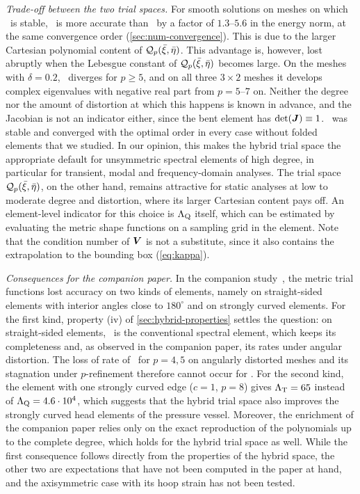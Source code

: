 \emph{Trade-off between the two trial spaces.} For smooth solutions on meshes on which \PM\ is stable, \PM\ is more accurate than \PH\ by a factor of $1.3$--$5.6$ in the energy norm, at the same convergence order (\cref{sec:num-convergence}). This is due to the larger Cartesian polynomial content of $\mathcal Q_p(\bar\xi,\bar\eta)$. This advantage is, however, lost abruptly when the Lebesgue constant of $\mathcal Q_p(\bar\xi,\bar\eta)$ becomes large. On the meshes with $\delta=0.2$, \PM\ diverges for $p\ge5$, and on all three $3\times2$ meshes it develops complex eigenvalues with negative real part from $p=5$--$7$ on. Neither the degree nor the amount of distortion at which this happens is known in advance, and the Jacobian is not an indicator either, since the bent element has $\det(\bm{J})\equiv1$. \PH\ was stable and converged with the optimal order in every case without folded elements that we studied. In our opinion, this makes the hybrid trial space the appropriate default for unsymmetric spectral elements of high degree, in particular for transient, modal and frequency-domain analyses. The trial space $\mathcal Q_p(\bar\xi,\bar\eta)$, on the other hand, remains attractive for static analyses at low to moderate degree and distortion, where its larger Cartesian content pays off. An element-level indicator for this choice is $\Lambda_{\mathrm{Q}}$ itself, which can be estimated by evaluating the metric shape functions on a sampling grid in the element. Note that the condition number of $\bm{V}$ is not a substitute, since it also contains the extrapolation to the bounding box (\cref{eq:kappa}).

\emph{Consequences for the companion paper.} In the companion study~\cite{Eisentraeger2026axisymmetric}, the metric trial functions lost accuracy on two kinds of elements, namely on straight-sided elements with interior angles close to $180^\circ$ and on strongly curved elements. For the first kind, property (iv) of \cref{sec:hybrid-properties} settles the question: on straight-sided elements, \PH\ is the conventional spectral element, which keeps its completeness and, as observed in the companion paper, its rates under angular distortion. The loss of rate of \PM\ for $p=4,5$ on angularly distorted meshes and its stagnation under $p$-refinement therefore cannot occur for \PH. For the second kind, the element with one strongly curved edge ($c=1$, $p=8$) gives $\Lambda_{\mathrm{T}}=65$ instead of $\Lambda_{\mathrm{Q}}=4.6\cdot10^{4}$, which suggests that the hybrid trial space also improves the strongly curved head elements of the pressure vessel. Moreover, the enrichment of the companion paper relies only on the exact reproduction of the polynomials up to the complete degree, which holds for the hybrid trial space as well. While the first consequence follows directly from the properties of the hybrid space, the other two are expectations that have not been computed in the paper at hand, and the axisymmetric case with its hoop strain has not been tested.

